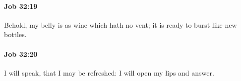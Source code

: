 		\paragraph{Job 32:19} %
			\label{JOB-32-19}

			Behold, my belly is as wine which hath no vent; it is ready to burst like new bottles.


		\paragraph{Job 32:20} %
			\label{JOB-32-20}

			I will speak, that I may be refreshed: I will open my lips and answer.


